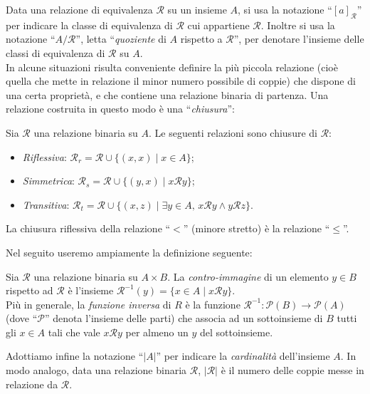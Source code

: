 Data una relazione di equivalenza $\mathcal{R}$ su un insieme $A$, si usa la notazione ``$[a]_{\mathcal{R}}$'' per indicare la classe di equivalenza di $\mathcal{R}$ cui appartiene $\mathcal{R}$. Inoltre si usa la notazione ``$A/\mathcal{R}$'', letta ``\emph{quoziente} di $A$ rispetto a $\mathcal{R}$'', per denotare l'insieme delle classi di equivalenza di $\mathcal{R}$ su $A$.\\
In alcune situazioni risulta conveniente definire la più piccola relazione (cioè quella che mette in relazione il minor numero possibile di coppie) che dispone di una certa proprietà, e che contiene una relazione binaria di partenza. Una relazione costruita in questo modo è una ``\emph{chiusura}'':
\begin{definition}
	Sia $\mathcal{R}$ una relazione binaria su $A$. Le seguenti relazioni sono chiusure di $\mathcal{R}$:
    \begin{itemize}
        \item \emph{Riflessiva}: $\mathcal{R}_r = \mathcal{R} \cup \{(x,x) \mid x \in A\}$;
        \item \emph{Simmetrica}: $\mathcal{R}_s = \mathcal{R} \cup \{(y,x) \mid x \mathcal{R} y\}$;
        \item \emph{Transitiva}: $\mathcal{R}_t = \mathcal{R} \cup \{(x,z) \mid \exists y \in A,\, x \mathcal{R} y \land y \mathcal{R} z\}$.
    \end{itemize}
\end{definition}
\begin{example}
    La chiusura riflessiva della relazione ``$<$'' (minore stretto) è la relazione ``$\leq$''.
\end{example}
Nel seguito useremo ampiamente la definizione seguente:
\begin{definition}
    Sia $\mathcal{R}$ una relazione binaria su $A \times B$. La \emph{contro-immagine} di un elemento $y \in B$ rispetto ad $\mathcal{R}$ è l'insieme $\mathcal{R}^{-1}(y) = \{x \in A \mid x \mathcal{R} y\}$.\\
    Più in generale, la \emph{funzione inversa} di $R$ è la funzione $\mathcal{R}^{-1} : \mathcal{P}(B) \to \mathcal{P}(A)$ (dove ``$\mathcal{P}$'' denota l'insieme delle parti) che associa ad un sottoinsieme di $B$ tutti gli $x \in A$ tali che vale $x \mathcal{R} y$ per almeno un $y$ del sottoinsieme.
\end{definition}
Adottiamo infine la notazione ``$|A|$'' per indicare la \emph{cardinalità} dell'insieme $A$. In modo analogo, data una relazione binaria $\mathcal{R}$, $|\mathcal{R}|$ è il numero delle coppie messe in relazione da $\mathcal{R}$.
